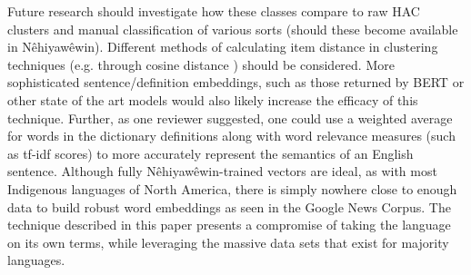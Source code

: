 Future research should investigate how these classes compare to raw HAC clusters and manual classification of various sorts (should these become available in Nêhiyawêwin). Different methods of calculating item distance in clustering techniques (e.g. through cosine distance \citep{dacanay2021}) should be considered. More sophisticated sentence/definition embeddings, such as those returned by BERT \citep{devlin2018bert} or other state of the art models would also likely increase the efficacy of this technique. Further, as one reviewer suggested, one could use a weighted average for words in the dictionary definitions along with word relevance measures (such as tf-idf scores) to more accurately represent the semantics of an English sentence. Although fully Nêhiyawêwin-trained vectors are ideal, as with most Indigenous languages of North America, there is simply nowhere close to enough data to build robust word embeddings as seen in the Google News Corpus. The technique described in this paper presents a compromise of taking the language on its own terms, while leveraging the massive data sets that exist for majority languages.
